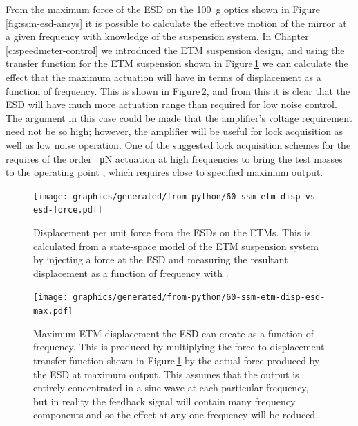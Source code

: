 From the maximum force of the \gls{ESD} on the \SI{100}{\gram} optics shown in Figure\,\ref{fig:ssm-esd-ansys} it is possible to calculate the effective motion of the mirror at a given frequency with knowledge of the suspension system. In Chapter\,\ref{c:speedmeter-control} we introduced the \gls{ETM} suspension design, and using the transfer function for the \gls{ETM} suspension shown in Figure\,\ref{fig:ssm-etm-disp-vs-esd-force} we can calculate the effect that the maximum actuation will have in terms of displacement as a function of frequency. This is shown in Figure\,\ref{fig:ssm-etm-disp-esd-max}, and from this it is clear that the \gls{ESD} will have much more actuation range than required for low noise control. The argument in this case could be made that the amplifier's voltage requirement need not be so high; however, the amplifier will be useful for lock acquisition as well as low noise operation. One of the suggested lock acquisition schemes for the \SSMEXPT{} requires of the order \SI{}{\micro\newton} actuation at high frequencies to bring the test masses to the operating point \cite{Glaefke2015}, which requires close to specified maximum output.

\begin{figure}
  \centering
  \texttt{[image: graphics/generated/from-python/60-ssm-etm-disp-vs-esd-force.pdf]}
  \caption[Displacement per unit force from the electrostatic drives on the end test masses]{\label{fig:ssm-etm-disp-vs-esd-force}Displacement per unit force from the \glspl{ESD} on the \glspl{ETM}. This is calculated from a state-space model of the \gls{ETM} suspension system by injecting a force at the \gls{ESD} and measuring the resultant displacement as a function of frequency with \SIMULINK{}.}
\end{figure}

\begin{figure}
  \centering
  \texttt{[image: graphics/generated/from-python/60-ssm-etm-disp-esd-max.pdf]}
  \caption[Maximum end test mass displacement the electrostatic drive can create]{\label{fig:ssm-etm-disp-esd-max}Maximum \gls{ETM} displacement the \gls{ESD} can create as a function of frequency. This is produced by multiplying the force to displacement transfer function shown in Figure\,\ref{fig:ssm-etm-disp-vs-esd-force} by the actual force produced by the \gls{ESD} at maximum output. This assumes that the output is entirely concentrated in a sine wave at each particular frequency, but in reality the feedback signal will contain many frequency components and so the effect at any one frequency will be reduced.}
\end{figure}

